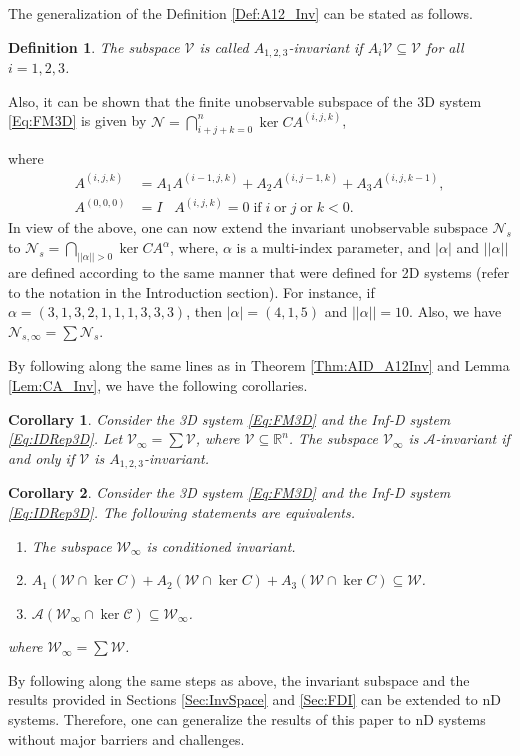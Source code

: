 \documentclass[journal,12pt,draftcls,onecolumn]{IEEEtran}
\newcommand{\ssp}[1]{\mathscr{#1}}      \newcommand{\setssp}[1]{\mathfrak{#1}}   \newcommand{\fld}[1]{\mathbb{#1}}       \newcommand{\op}[1]{\mathcal{#1}}       \newcommand{\sumbanach}[1]{\sum{#1}}
\def\QEDclosed{\hfill\IEEEQEDclosed}
\renewcommand{\qed}{\QEDclosed}
\newtheorem{corollary}{Corollary}
\newtheorem{definition}{Definition}
\begin{document}
The generalization of the Definition \ref{Def:A12_Inv} can be stated as follows.
\begin{definition}
	The subspace $\ssp{V}$ is called $A_{1,2,3}$-invariant if $A_i\ssp{V}\subseteq\ssp{V}$ for all $i=1,2,3$.\qed
\end{definition}
Also, it can be shown that the finite unobservable subspace of the 3D system \eqref{Eq:FM3D} is given by   $\ssp{N}=\bigcap_{i+j+k=0}^n \ker CA^{(i,j,k)}$,

where
\begin{equation*}
\begin{split}
A^{(i,j,k)} &= A_1 A^{(i-1,j,k)}+A_2 A^{(i,j-1,k)}+ A_3A^{(i,j,k-1)},\\
A^{(0,0,0)} &= I\;\;\; A^{(i,j,k)}=0\;\mathrm{if} \; i \; \mathrm{or} \; j\; \mathrm{or}\; k < 0.
\end{split}
\end{equation*}
In view of the above, one can now extend the invariant unobservable subspace $\ssp{N}_s$ to
$\ssp{N}_s = \bigcap_{||\alpha||>0}\ker CA^\alpha$,
where, $\alpha$ is a multi-index parameter, and $|\alpha|$ and $||\alpha||$ are defined according to the same manner that were defined for 2D systems (refer to the notation in the Introduction section). For instance, if $\alpha = (3,1,3,2,1,1,1,3,3,3)$, then $|\alpha| = (4,1,5)$ and $||\alpha|| = 10$. Also, we have $\ssp{N}_{s,\infty}=\sum\ssp{N}_s$.

By following along the same lines as in Theorem \ref{Thm:AID_A12Inv} and Lemma \ref{Lem:CA_Inv}, we have the following corollaries.
\begin{corollary}\label{Col:AID_A123}
	Consider the 3D system \eqref{Eq:FM3D} and the Inf-D system \eqref{Eq:IDRep3D}. Let $\ssp{V}_\infty = \sum \ssp{V}$, where $\ssp{V}\subseteq\fld{R}^n$. The subspace $\ssp{V}_\infty$ is $\op{A}$-invariant if and only if $\ssp{V}$ is $A_{1,2,3}$-invariant.
\end{corollary}
\begin{corollary}
	Consider the 3D system \eqref{Eq:FM3D} and the Inf-D system \eqref{Eq:IDRep3D}. The following statements are equivalents.
	\begin{enumerate}
		\renewcommand{\labelenumi}{(\roman{enumi})}
		\item The subspace $\ssp{W}_\infty$ is conditioned invariant.
		\item  $A_1(\ssp{W}\cap\ker C)+A_2(\ssp{W}\cap\ker C)+A_3(\ssp{W}\cap\ker C)\subseteq\ssp{W}$.
		\item $\op{A}(\ssp{W}_\infty\cap\ker\op{C})\subseteq\ssp{W}_\infty$.
	\end{enumerate} 
	where $\ssp{W}_\infty = \sum \ssp{W}$.
\end{corollary}

By following along the same steps as above, the invariant subspace and the results provided in Sections \ref{Sec:InvSpace} and \ref{Sec:FDI} can be extended to  nD systems. Therefore, one can generalize the results of this paper to nD systems without major barriers and challenges.



\end{document}
